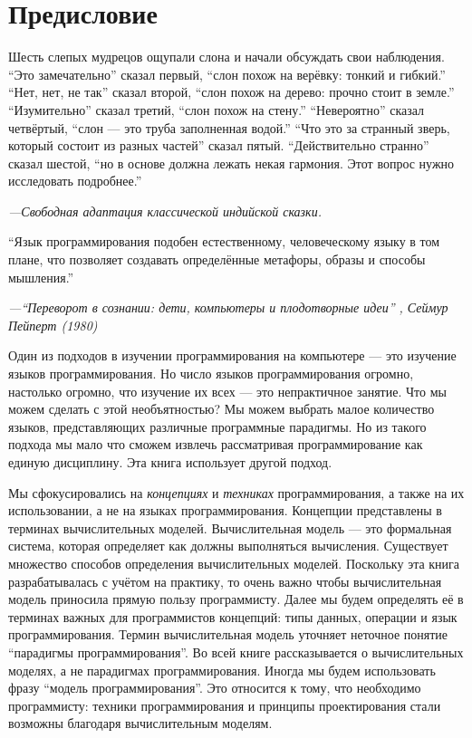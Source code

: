 \chapter*{Предисловие}

{\setlength{\epigraphwidth}{0.8\textwidth} \epigraph{Шесть слепых мудрецов ощупали слона и начали обсуждать свои наблюдения. ``Это замечательно'' сказал первый, ``слон похож на верёвку: тонкий и гибкий.'' ``Нет, нет, не так'' сказал второй, ``слон похож на дерево: прочно стоит в земле.'' ``Изумительно'' сказал третий, ``слон похож на стену.'' ``Невероятно'' сказал четвёртый, ``слон --- это труба заполненная водой.'' ``Что это за странный зверь, который состоит из разных частей'' сказал пятый. ``Действительно странно'' сказал шестой, ``но в основе должна лежать некая гармония. Этот вопрос нужно исследовать подробнее.''}{\emph{---Свободная адаптация классической индийской сказки.}}}

{\setlength{\epigraphwidth}{0.8\textwidth} \epigraph{``Язык программирования подобен естественному, человеческому языку в том плане, что позволяет создавать определённые метафоры, образы и способы мышления.''}{\emph{---``Переворот в сознании: дети, компьютеры и плодотворные идеи'' \cite{141}, Сеймур Пейперт (1980)}}}

Один из подходов в изучении программирования на компьютере --- это изучение языков программирования. Но число языков программирования огромно, настолько огромно, что изучение их всех --- это непрактичное занятие. Что мы можем сделать с этой необъятностью? Мы можем выбрать малое количество языков, представляющих различные программные парадигмы. Но из такого подхода мы мало что сможем извлечь рассматривая программирование как единую дисциплину. Эта книга использует другой подход.

Мы сфокусировались на \emph{концепциях} и \emph{техниках} программирования, а также на их использовании, а не на языках программирования. Концепции представлены в терминах вычислительных моделей. Вычислительная модель --- это формальная система, которая определяет как должны выполняться вычисления. Существует множество способов определения вычислительных моделей. Поскольку эта книга разрабатывалась с учётом на практику, то очень важно чтобы вычислительная модель приносила прямую пользу программисту. Далее мы будем определять её в терминах важных для программистов концепций: типы данных, операции и язык программирования. Термин вычислительная модель уточняет неточное понятие ``парадигмы программирования''. Во всей книге рассказывается о вычислительных моделях, а не парадигмах программирования. Иногда мы будем использовать фразу ``модель программирования''. Это относится к тому, что необходимо программисту: техники программирования и принципы проектирования стали возможны благодаря вычислительным моделям.

